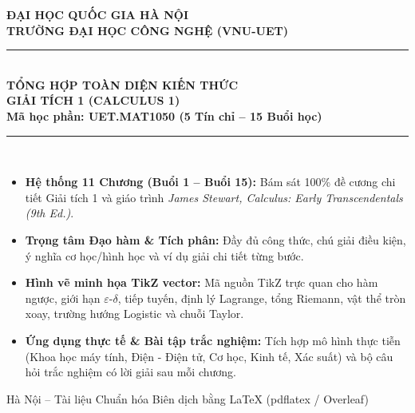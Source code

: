 \documentclass[11pt,a4paper,oneside]{book}
\begin{document}
\begin{titlepage}
    \centering
    \vspace*{1cm}
    {\Large \textbf{ĐẠI HỌC QUỐC GIA HÀ NỘI}}\\[4pt]
    {\Large \textbf{TRƯỜNG ĐẠI HỌC CÔNG NGHỆ (VNU-UET)}}\\[1.5cm]
    \rule{\textwidth}{1.5pt}\\[0.5cm]
    {\Huge \bfseries TỔNG HỢP TOÀN DIỆN KIẾN THỨC\\[8pt] GIẢI TÍCH 1 (CALCULUS 1)}\\[0.4cm]
    {\large \textbf{Mã học phần: UET.MAT1050 (5 Tín chỉ -- 15 Buổi học)}}\\[0.4cm]
    \rule{\textwidth}{1.5pt}\\[1.2cm]
    
    \begin{tcolorbox}[colback=slate!4!white,colframe=uetblue,width=0.92\textwidth,title={\textbf{Cấu trúc Tài liệu Chuẩn Đề cương UET.MAT1050}}]
    \begin{itemize}[leftmargin=1.5em, itemsep=4pt]
        \item \textbf{Hệ thống 11 Chương (Buổi 1 -- Buổi 15):} Bám sát 100\% đề cương chi tiết Giải tích 1 và giáo trình \textit{James Stewart, Calculus: Early Transcendentals (9th Ed.)}.
        \item \textbf{Trọng tâm Đạo hàm \& Tích phân:} Đầy đủ công thức, chú giải điều kiện, ý nghĩa cơ học/hình học và ví dụ giải chi tiết từng bước.
        \item \textbf{Hình vẽ minh họa TikZ vector:} Mã nguồn TikZ trực quan cho hàm ngược, giới hạn $\varepsilon$-$\delta$, tiếp tuyến, định lý Lagrange, tổng Riemann, vật thể tròn xoay, trường hướng Logistic và chuỗi Taylor.
        \item \textbf{Ứng dụng thực tế \& Bài tập trắc nghiệm:} Tích hợp mô hình thực tiễn (Khoa học máy tính, Điện - Điện tử, Cơ học, Kinh tế, Xác suất) và bộ câu hỏi trắc nghiệm có lời giải sau mỗi chương.
    \end{itemize}
    \end{tcolorbox}
    
    \vfill
    {\large Hà Nội -- Tài liệu Chuẩn hóa Biên dịch bằng \LaTeX{} (pdflatex / Overleaf)}
\end{titlepage}

\tableofcontents
\newpage
\end{document}
